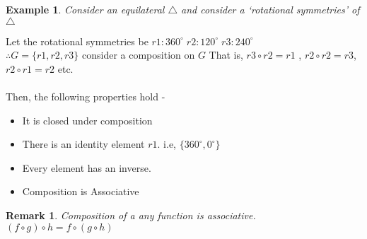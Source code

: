 \documentclass[12pt,a4paper]{article}
\newtheorem{rem}{Remark}
\newtheorem{ex}{Example}
\begin{document}
  \begin{ex}
    Consider an equilateral $\triangle$ and consider a    `rotational symmetries' of $\triangle$ 
  \end{ex}
  \begin{center}
  \end{center}
  Let the rotational symmetries be $r1: 360^{\circ}\;r2: 120^{\circ}\;r3: 240^{\circ}$\\
  $\therefore G=\{r1,r2,r3\}$ consider a composition on $G$ That is, $r3\circ r2=r1$ ,  $r2\circ r2=r3$, $r2\circ r1=r2$ etc.\\ \\
  Then, the following properties hold -
  \begin{itemize}
    \item It is closed under composition
    \item There is an identity element $r1$. i.e, $\{360^{\circ},0^{\circ}\}$
    \item Every element has an inverse.
    \item Composition is Associative 
  \end{itemize}
  \begin{rem}
    Composition of a any function is associative. $(f\circ g)\circ h = f\circ (g\circ h)$
  \end{rem}
  
\end{document}
